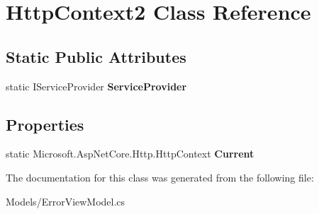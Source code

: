\hypertarget{class_http_context2}{}\section{Http\+Context2 Class Reference}
\label{class_http_context2}
\subsection*{Static Public Attributes}
\begin{DoxyCompactItemize}
\item 
\mbox{\label{class_http_context2_adcdea75014083949d082453c20717bed}} 
static I\+Service\+Provider {\bfseries Service\+Provider}
\end{DoxyCompactItemize}
\subsection*{Properties}
\begin{DoxyCompactItemize}
\item 
\mbox{\label{class_http_context2_ab6d310a5e69eab91bfc5661c6d3557c0}} 
static Microsoft.\+Asp\+Net\+Core.\+Http.\+Http\+Context {\bfseries Current}
\end{DoxyCompactItemize}


The documentation for this class was generated from the following file\+:\begin{DoxyCompactItemize}
\item 
Models/Error\+View\+Model.\+cs\end{DoxyCompactItemize}
